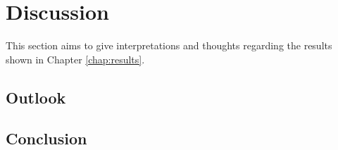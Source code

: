 \chapter{Discussion}
\label{chap:discussion}

This section aims to give interpretations and thoughts regarding the results shown in Chapter \ref{chap:results}.


\section{Outlook}
\label{sec:outlook}

\section{Conclusion}
\label{sec:conclusion}
